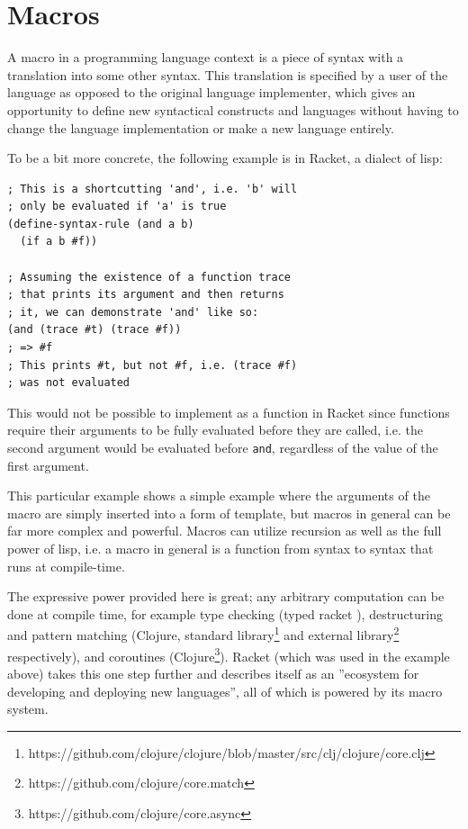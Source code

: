 \documentclass{kththesis}
\begin{document}
\section{Macros}

A macro in a programming language context is a piece of syntax with a translation into some other syntax. This translation is specified by a user of the language as opposed to the original language implementer, which gives an opportunity to define new syntactical constructs and languages without having to change the language implementation or make a new language entirely.

To be a bit more concrete, the following example is in Racket\cite{Flatt2010Reference:-Rack}, a dialect of lisp:

\begin{verbatim}
; This is a shortcutting 'and', i.e. 'b' will
; only be evaluated if 'a' is true
(define-syntax-rule (and a b)
  (if a b #f))

; Assuming the existence of a function trace
; that prints its argument and then returns
; it, we can demonstrate 'and' like so:
(and (trace #t) (trace #f))
; => #f
; This prints #t, but not #f, i.e. (trace #f)
; was not evaluated
\end{verbatim}

This would not be possible to implement as a function in Racket since functions require their arguments to be fully evaluated before they are called, i.e. the second argument would be evaluated before \texttt{and}, regardless of the value of the first argument.

This particular example shows a simple example where the arguments of the macro are simply inserted into a form of template, but macros in general can be far more complex and powerful. Macros can utilize recursion as well as the full power of lisp, i.e. a macro in general is a function from syntax to syntax that runs at compile-time.

The expressive power provided here is great; any arbitrary computation can be done at compile time, for example type checking (typed racket \cite{Tobin-Hochstadt:2011:LL:1993498.1993514}), destructuring and pattern matching (Clojure, standard library\footnote{https://github.com/clojure/clojure/blob/master/src/clj/clojure/core.clj} and external library\footnote{https://github.com/clojure/core.match} respectively), and coroutines (Clojure\footnote{https://github.com/clojure/core.async}). Racket (which was used in the example above) takes this one step further and describes itself as an ''ecosystem for developing and deploying new languages'', all of which is powered by its macro system.
\end{document}
